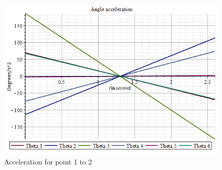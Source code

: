 \begin{figure}[H]
  \centering
  \begin{minipage}[b]{0.45\textwidth}
    \includegraphics[width=\textwidth]{Design/acccb.png}
    \caption{Acceleration for point 1 to 2}
    \label{fig:acceleration}
   \end{minipage}
\end{figure}
 

